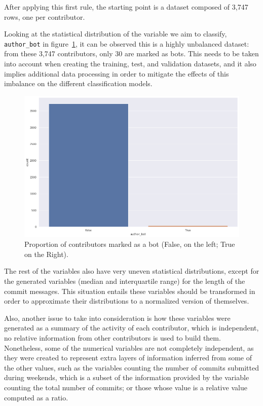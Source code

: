 \documentclass[a4paper, 12pt]{book}
\begin{document}
After applying this first rule, the starting point is a dataset composed of 3,747 rows, one per contributor.

Looking at the statistical distribution of the variable we aim to classify, \texttt{author\_bot} in figure~\ref{fig:eda-contributors-bot-proportion}, it can be observed this is a highly unbalanced dataset: from these 3,747 contributors, only 30 are marked as bots. This needs to be taken into account when creating the training, test, and validation datasets, and it also implies additional data processing in order to mitigate the effects of this imbalance on the different classification models.

\begin{figure}
 \centering
  \includegraphics[width=15cm, keepaspectratio]{img/authors_bots_proportion.png}
  \caption{Proportion of contributors marked as a bot (False, on the left; True on the Right).}
  \label{fig:eda-contributors-bot-proportion}
\end{figure}

The rest of the variables also have very uneven statistical distributions, except for the generated variables (median and interquartile range) for the length of the commit messages. This situation entails these variables should be transformed in order to approximate their distributions to a normalized version of themselves.

Also, another issue to take into consideration is how these variables were generated as a summary of the activity of each contributor, which is independent, no relative information from other contributors is used to build them. Nonetheless, some of the numerical variables are not completely independent, as they were created to represent extra layers of information inferred from some of the other values, such as the variables counting the number of commits submitted during weekends, which is a subset of the information provided by the variable counting the total number of commits; or those whose value is a relative value computed as a ratio.
\end{document}
